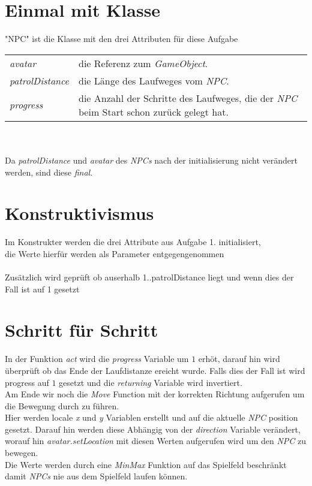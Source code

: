 \documentclass{pi1}
\begin{document}
\section{Einmal mit Klasse}
"NPC" ist die Klasse mit den drei Attributen für diese Aufgabe

\begin{tabular}{ll}
\textit{avatar} &die Referenz zum \textit{GameObject}.\\
\textit{patrolDistance} &die Länge des Laufweges vom \textit{NPC}.\\
\textit{progress} &die Anzahl der Schritte des Laufweges, die der \textit{NPC} beim Start schon zurück gelegt hat.
\end{tabular}\\\\
Da \textit{patrolDistance} und \textit{avatar} des \textit{NPCs} nach der initialisierung nicht verändert werden, sind diese \textit{final}.

\section{Konstruktivismus}

Im Konstrukter werden die drei Attribute aus Aufgabe 1. initialisiert,\\ die Werte hierfür werden als Parameter entgegengenommen\\\\
Zusätzlich wird geprüft ob auserhalb 1..patrolDistance liegt und wenn dies der Fall ist auf 1 gesetzt
\newpage

\section{Schritt für Schritt}

In der Funktion \textit{act} wird die \textit{progress} Variable um $1$ erhöt, darauf hin wird überprüft ob das Ende der Laufdistanze ereicht wurde. Falls dies der Fall ist wird progress auf $1$ gesetzt und die \textit{returning} Variable wird invertiert.\\
Am Ende wir noch die \textit{Move} Function mit der korrekten Richtung aufgerufen um die Bewegung durch zu führen.\\

Hier werden locale \textit{x} und \textit{y} Variablen erstellt und auf die aktuelle \textit{NPC} position gesetzt. Darauf hin werden diese Abhängig von der \textit{direction} Variable verändert, worauf hin \textit{avatar.setLocation} mit diesen Werten aufgerufen wird um den \textit{NPC} zu bewegen.\\
Die Werte werden durch eine \textit{MinMax} Funktion auf das Spielfeld beschränkt damit \textit{NPCs} nie aus dem Spielfeld laufen können.
\end{document}
